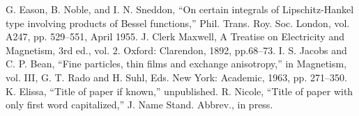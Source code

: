 \documentclass[conference]{IEEEtran}
\begin{document}
\begin{thebibliography}{00}
 G. Eason, B. Noble, and I. N. Sneddon, ``On certain integrals of Lipschitz-Hankel type involving products of Bessel functions,'' Phil. Trans. Roy. Soc. London, vol. A247, pp. 529--551, April 1955.
 J. Clerk Maxwell, A Treatise on Electricity and Magnetism, 3rd ed., vol. 2. Oxford: Clarendon, 1892, pp.68--73.
 I. S. Jacobs and C. P. Bean, ``Fine particles, thin films and exchange anisotropy,'' in Magnetism, vol. III, G. T. Rado and H. Suhl, Eds. New York: Academic, 1963, pp. 271--350.
 K. Elissa, ``Title of paper if known,'' unpublished.
 R. Nicole, ``Title of paper with only first word capitalized,'' J. Name Stand. Abbrev., in press.
\end{thebibliography}
\end{document}
